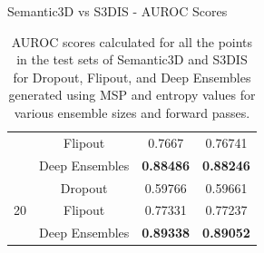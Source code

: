 \documentclass[aspectratio=169]{beamer}
\begin{document}
\begin{frame}{Semantic3D vs S3DIS - AUROC Scores}
\begin{table}[h!]
{\begin{tabular}{cccc}
                                        & Flipout              & 0.7667           & 0.76741          \\
                                        & Deep Ensembles       & \textbf{0.88486} & \textbf{0.88246} \\ \hline
                \multirow{3}{*}{20}     & Dropout              & 0.59766          & 0.59661          \\
                                        & Flipout              & 0.77331          & 0.77237          \\
                                        & Deep Ensembles       & \textbf{0.89338} & \textbf{0.89052} \\ \hline
                \end{tabular}
                }
                \caption{AUROC scores calculated for all the points in the test sets of Semantic3D and S3DIS for Dropout, Flipout, and  Deep Ensembles generated using MSP and entropy values for various ensemble sizes and forward passes.}
                \label{tab:sem3dvs3dis_auroc}
            \end{table}
\end{frame}
\end{document}
